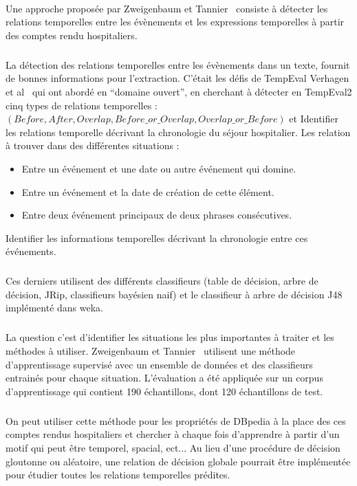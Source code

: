 \documentclass[12pt,a4	]{report}
\begin{document}
\paragraph{}
Une approche proposée par Zweigenbaum et Tannier~\cite{zweigenbaum2013} consiste à détecter les relations temporelles entre les évènements et les expressions temporelles à partir des comptes rendu hospitaliers.
\subparagraph{}
La détection des relations temporelles entre les évènements dans un texte, fournit de bonnes informations pour l’extraction.
\newline
C’était les défis de TempEval Verhagen et al~\cite{verhagen2010} qui ont abordé en “domaine ouvert”, en cherchant à détecter en TempEval2 cinq types de relations temporelles :
\newline
$(Before, After, Overlap, Before\_or\_Overlap, Overlap\_or\_Before)$
et Identifier les relations temporelle décrivant la chronologie du séjour hospitalier.
\newline
Les relation à trouver dans des différentes situations :
\begin{itemize}
\item{}Entre un événement et une date ou autre événement qui domine.
\item{}Entre un événement et la date de création de cette élément.
\item{}Entre deux événement principaux de deux phrases consécutives.
\end{itemize}
Identifier les informations temporelles décrivant la chronologie entre ces événements.
\subparagraph{}
Ces derniers utilisent des différents classifieurs (table de décision, arbre de décision, JRip, classifieurs bayésien naif) et le classifieur à arbre de décision J48 implémenté dans weka.
\subparagraph{}
La question c’est d’identifier les situations les plus importantes à traiter et les méthodes à utiliser.
Zweigenbaum et Tannier~\cite{zweigenbaum2013} utilisent une méthode d’apprentissage supervisé avec un ensemble de données et des classifieurs entrainés pour chaque situation. 
L'évaluation a été appliquée sur un corpus d’apprentissage qui contient 190 échantillons, dont 120 échantillons de test.
\subparagraph{}
On peut utiliser cette méthode pour les propriétés de DBpedia à la place des ces comptes rendus hospitaliers et chercher à chaque fois d'apprendre à partir d'un motif qui peut être temporel, spacial, ect...
Au lieu d’une procédure de décision gloutonne ou aléatoire, une relation de décision globale pourrait être implémentée pour étudier toutes les relations temporelles prédites. 
\end{document}
